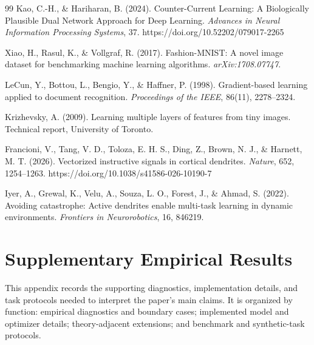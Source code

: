 \begin{thebibliography}{99}
    Kao, C.-H., \& Hariharan, B. (2024).
    Counter-Current Learning: A Biologically Plausible Dual Network Approach for Deep Learning.
    \emph{Advances in Neural Information Processing Systems}, 37.
    https://doi.org/10.52202/079017-2265
    
    Xiao, H., Rasul, K., \& Vollgraf, R. (2017).
    Fashion-MNIST: A novel image dataset for benchmarking machine learning algorithms.
    \emph{arXiv:1708.07747}.
    
    LeCun, Y., Bottou, L., Bengio, Y., \& Haffner, P. (1998).
    Gradient-based learning applied to document recognition.
    \emph{Proceedings of the IEEE}, 86(11), 2278--2324.
    
    Krizhevsky, A. (2009).
    Learning multiple layers of features from tiny images.
    Technical report, University of Toronto.
    
    Francioni, V., Tang, V. D., Toloza, E. H. S., Ding, Z., Brown, N. J., \& Harnett, M. T. (2026).
    Vectorized instructive signals in cortical dendrites.
    \emph{Nature}, 652, 1254--1263. https://doi.org/10.1038/s41586-026-10190-7
    
    Iyer, A., Grewal, K., Velu, A., Souza, L. O., Forest, J., \& Ahmad, S. (2022).
    Avoiding catastrophe: Active dendrites enable multi-task learning in dynamic environments.
    \emph{Frontiers in Neurorobotics}, 16, 846219.
    
    \end{thebibliography}
    
    \appendix
    \renewcommand{\thefigure}{S\arabic{figure}}
    \setcounter{figure}{0}
    \renewcommand{\thetable}{S\arabic{table}}
    \setcounter{table}{0}
    
    \section{Supplementary Empirical Results}
    \label{app:extra_results}
    This appendix records the supporting diagnostics, implementation details, and task protocols needed to interpret the paper's main claims. It is organized by function: empirical diagnostics and boundary cases; implemented model and optimizer details; theory-adjacent extensions; and benchmark and synthetic-task protocols.


